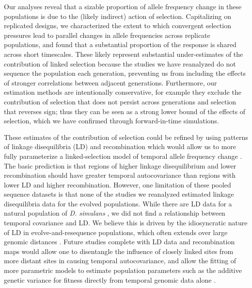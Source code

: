 \documentclass[11pt]{article}
\begin{document}
Our analyses reveal that a sizable proportion of allele frequency change in
these populations is due to the (likely indirect) action of selection.
Capitalizing on replicated designs, we characterized the extent to which
convergent selection pressures lead to parallel changes in allele frequencies
across replicate populations, and found that a substantial proportion of
the response is shared across short timescales. These likely represent
substantial under-estimates of the contribution of linked selection because the
studies we have reanalyzed do not sequence the population each generation,
preventing us from including the effects of stronger correlations between
adjacent generations.  Furthermore, our estimation methods are intentionally
conservative, for example they exclude the contribution of selection that does
not persist across generations and selection that reverses sign; thus they can
be seen as a strong lower bound of the effects of selection, which we have
confirmed through forward-in-time simulations.

These estimates of the contribution of selection could be refined by using
patterns of linkage disequilibria (LD) and recombination which would allow
us to more fully parameterize a linked-selection model of temporal allele
frequency change \parencite{Buffalo2019-io}. The basic prediction is that
regions of higher linkage disequilibrium and lower recombination should have
greater temporal autocovariance than regions with lower LD and higher
recombination. However, one limitation of these pooled sequence datasets is
that none of the studies we reanalyzed estimated linkage disequilibria data for
the evolved populations.  While there are LD data for a natural population of
\emph{D. simulans} \parencite{Signor2018-wg,Howie2018-ay},  we did not find a
relationship between temporal covariance and LD.  We believe this is driven by
the idiosyncratic nature of LD in evolve-and-resequence populations, which
often extends over large genomic distances
\parencite{Nuzhdin2013-gf,Kelly2019-dc}. Future studies complete with LD data
and recombination maps would allow one to disentangle the influence of closely
linked sites from more distant sites in causing temporal autocovariance, and
allow the fitting of more parametric models to estimate population parameters
such as the additive genetic variance for fitness directly from temporal
genomic data alone \parencite{Buffalo2019-io}.

\end{document}

